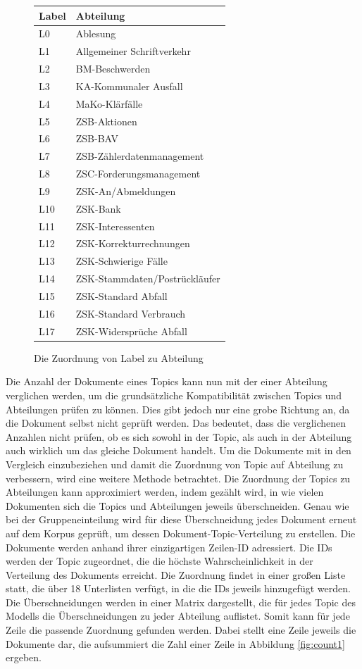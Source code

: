 \documentclass[german,version-2020-11]{uzl-thesis}
\begin{document}
\begin{figure}[H]
\begin{center}
\begin{tabular}{ll}
\hline
\hline
Label&Abteilung\\
\hline
L0&Ablesung\\
L1&Allgemeiner Schriftverkehr\\
L2&BM-Beschwerden\\
L3&KA-Kommunaler Ausfall\\
L4&MaKo-Klärfälle\\
L5&ZSB-Aktionen\\
L6&ZSB-BAV\\
L7&ZSB-Zählerdatenmanagement\\
L8&ZSC-Forderungsmanagement\\
L9&ZSK-An/Abmeldungen\\
L10&ZSK-Bank\\
L11&ZSK-Interessenten\\
L12&ZSK-Korrekturrechnungen\\
L13&ZSK-Schwierige Fälle\\
L14&ZSK-Stammdaten/Postrückläufer\\
L15&ZSK-Standard Abfall\\
L16&ZSK-Standard Verbrauch\\
L17&ZSK-Widersprüche Abfall\\
\hline
\hline
\end{tabular}
\caption{Die Zuordnung von Label zu Abteilung}
\label{fig:labels}
\end{center}
\end{figure}


Die Anzahl der Dokumente eines Topics kann nun mit der einer Abteilung verglichen werden, um die grundsätzliche Kompatibilität zwischen Topics und Abteilungen prüfen zu können. Dies gibt jedoch nur eine grobe Richtung an, da die Dokument selbst nicht geprüft werden. Das bedeutet, dass die verglichenen Anzahlen nicht prüfen, ob es sich sowohl in der Topic, als auch in der Abteilung auch wirklich um das gleiche Dokument handelt. Um die Dokumente mit in den Vergleich einzubeziehen und damit die Zuordnung von Topic auf Abteilung zu verbessern, wird eine weitere Methode betrachtet. Die Zuordnung der Topics zu Abteilungen kann approximiert werden, indem gezählt wird, in wie vielen Dokumenten sich die Topics und Abteilungen jeweils überschneiden. Genau wie bei der Gruppeneinteilung wird für diese Überschneidung jedes Dokument erneut auf dem Korpus geprüft, um dessen Dokument-Topic-Verteilung zu erstellen. Die Dokumente werden anhand ihrer einzigartigen Zeilen-ID adressiert. Die IDs werden der Topic zugeordnet, die die höchste Wahrscheinlichkeit in der Verteilung des Dokuments erreicht. Die Zuordnung findet in einer großen Liste statt, die über 18 Unterlisten verfügt, in die die IDs jeweils hinzugefügt werden. Die Überschneidungen werden in einer Matrix dargestellt, die für jedes Topic des Modells die Überschneidungen zu jeder Abteilung auflistet. Somit kann für jede Zeile die passende Zuordnung gefunden werden. Dabei stellt eine Zeile jeweils die Dokumente dar, die aufsummiert die Zahl einer Zeile in Abbildung \ref{fig:count1} ergeben. 
\end{document}
